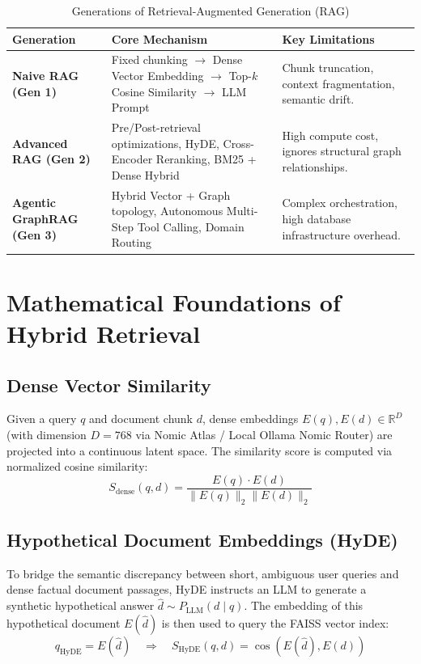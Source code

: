 \documentclass[12pt,a4paper,oneside]{report}
\begin{document}
\begin{table}[H]
\centering
\small
\caption{Generations of Retrieval-Augmented Generation (RAG)}
\label{tab:rag_generations}
\begin{tabularx}{\textwidth}{lXp{4.5cm}}
\toprule
\textbf{Generation} & \textbf{Core Mechanism} & \textbf{Key Limitations} \\
\midrule
\textbf{Naive RAG (Gen 1)} & Fixed chunking $\rightarrow$ Dense Vector Embedding $\rightarrow$ Top-$k$ Cosine Similarity $\rightarrow$ LLM Prompt & Chunk truncation, context fragmentation, semantic drift. \\
\addlinespace
\textbf{Advanced RAG (Gen 2)} & Pre/Post-retrieval optimizations, HyDE, Cross-Encoder Reranking, BM25 + Dense Hybrid & High compute cost, ignores structural graph relationships. \\
\addlinespace
\textbf{Agentic GraphRAG (Gen 3)} & Hybrid Vector + Graph topology, Autonomous Multi-Step Tool Calling, Domain Routing & Complex orchestration, high database infrastructure overhead. \\
\bottomrule
\end{tabularx}
\end{table}

\section{Mathematical Foundations of Hybrid Retrieval}

\subsection{Dense Vector Similarity}
Given a query $q$ and document chunk $d$, dense embeddings $E(q), E(d) \in \mathbb{R}^{D}$ (with dimension $D=768$ via Nomic Atlas / Local Ollama Nomic Router) are projected into a continuous latent space. The similarity score is computed via normalized cosine similarity:
\begin{equation}
    S_{\text{dense}}(q, d) = \frac{E(q) \cdot E(d)}{\|E(q)\|_2 \|E(d)\|_2}
\end{equation}

\subsection{Hypothetical Document Embeddings (HyDE)}
To bridge the semantic discrepancy between short, ambiguous user queries and dense factual document passages, HyDE instructs an LLM to generate a synthetic hypothetical answer $\hat{d} \sim P_{\text{LLM}}(d \mid q)$. The embedding of this hypothetical document $E(\hat{d})$ is then used to query the FAISS vector index:
\begin{equation}
    q_{\text{HyDE}} = E(\hat{d}) \quad \Longrightarrow \quad S_{\text{HyDE}}(q, d) = \cos(E(\hat{d}), E(d))
\end{equation}
\end{document}
